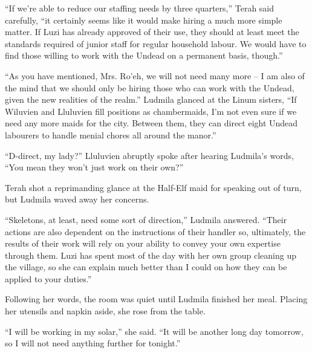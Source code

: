  

“If we’re able to reduce our staffing needs by three quarters,” Terah said carefully, “it certainly seems like it would make hiring a much more simple matter. If Luzi has already approved of their use, they should at least meet the standards required of junior staff for regular household labour. We would have to find those willing to work with the Undead on a permanent basis, though.”

 

“As you have mentioned, Mrs. Ro’eh, we will not need many more – I am also of the mind that we should only be hiring those who can work with the Undead, given the new realities of the realm.” Ludmila glanced at the Linum sisters, “If Wiluvien and Lluluvien fill positions as chambermaids, I’m not even sure if we need any more maids for the city. Between them, they can direct eight Undead labourers to handle menial chores all around the manor.”

 

“D-direct, my lady?” Lluluvien abruptly spoke after hearing Ludmila’s words, “You mean they won’t just work on their own?”

 

Terah shot a reprimanding glance at the Half-Elf maid for speaking out of turn, but Ludmila waved away her concerns.

 

“Skeletons, at least, need some sort of direction,” Ludmila answered. “Their actions are also dependent on the instructions of their handler so, ultimately, the results of their work will rely on your ability to convey your own expertise through them. Luzi has spent most of the day with her own group cleaning up the village, so she can explain much better than I could on how they can be applied to your duties.”

 

Following her words, the room was quiet until Ludmila finished her meal. Placing her utensils and napkin aside, she rose from the table.

 

“I will be working in my solar,” she said. “It will be another long day tomorrow, so I will not need anything further for tonight.”